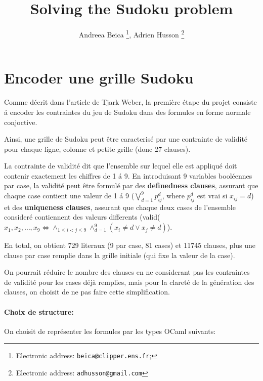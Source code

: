 \documentclass[10pt,a4paper]{article}
\begin{document}
\title{Solving the Sudoku problem}
\author{Andreea Beica%
  \thanks{Electronic address: \texttt{beica@clipper.ens.fr}; }, Adrien Husson%
  \thanks{Electronic address: \texttt{adhusson@gmail.com}}}
\maketitle

\section{Encoder une grille Sudoku}

Comme d\'{e}crit dans l'article de Tjark Weber, la premi\`{e}re \'{e}tape du projet consiste \'{a} encoder les contraintes du jeu de Sudoku dans des formules en forme normale conjoctive.

Ainsi, une grille de Sudoku peut \^{e}tre caracteris\'{e} par une contrainte de validit\'{e} pour chaque ligne, colonne et petite grille (donc 27 clauses). 

La contrainte de validit\'{e} dit que l'ensemble sur lequel elle est appliqu\'{e} doit contenir exactement les chiffres de 1 \'{a} 9. En introduisant 9 variables bool\'{e}ennes par case, la validit\'{e} peut \^{e}tre formul\'{e} par des \textbf{definedness clauses}, assurant que chaque case contient une valeur de 1 \'{a} 9 ($\bigvee_{d=1}^{9}p_{ij}^d$, where $p_{ij}^d$ est vrai si $x_{ij} = d$) et des \textbf{uniqueness clauses}, assurant que chaque deux cases de l'ensemble consider\'{e} contiennent des valeurs differents (valid($x_1, x_2, \ldots, x_9 \Leftrightarrow \land_{1\leq i < j \leq 9} \land_{d=1}^{9} (x_i \neq d \vee x_j \neq d )$).

En total, on obtient 729 literaux (9 par case, 81 cases) et 11745 clauses, plus une clause par case remplie dans la grille initiale (qui fixe la valeur de la case).

On pourrait r\'{e}duire le nombre des clauses en ne considerant pas les contraintes de validit\'{e} pour les cases d\'{e}j\`{a} remplies, mais pour la claret\'{e} de la g\'{e}n\'{e}ration des clauses, on choisit de ne pas faire cette simplification.

\paragraph{Choix de structure:}

On choisit de repr\'{e}senter les formules par les types OCaml suivants:
\end{document}
